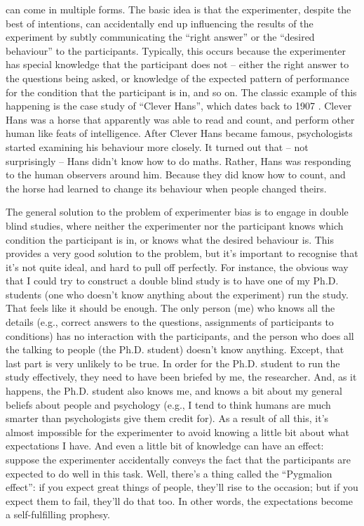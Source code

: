 
 can come in multiple forms. The basic idea is that the experimenter, despite the best of intentions, can accidentally end up influencing the results of the experiment by subtly communicating the ``right answer'' or the ``desired behaviour'' to the participants. Typically, this occurs because the experimenter has special knowledge that the participant does not -- either the right answer to the questions being asked, or knowledge of the expected pattern of performance for the condition that the participant is in, and so on. The classic example of this happening is the case study of ``Clever Hans'', which dates back to 1907 \parencite{Pfungst1911,Hothersall2004}. Clever Hans was a horse that apparently was able to read and count, and perform other human like feats of intelligence. After Clever Hans became famous, psychologists started examining his behaviour more closely. It turned out that -- not surprisingly -- Hans didn't know how to do maths. Rather, Hans was responding to the human observers around him. Because they did know how to count, and the horse had learned to change its behaviour when people changed theirs. 



The general solution to the problem of experimenter bias is to engage in double blind studies, where neither the experimenter nor the participant knows which condition the participant is in, or knows what the desired behaviour is. This provides a very good solution to the problem, but it's important to recognise that it's not quite ideal, and hard to pull off perfectly. For instance, the obvious way that I could try to construct a double blind study is to have one of my Ph.D. students (one who doesn't know anything about the experiment) run the study. That feels like it should be enough. The only person (me) who knows all the details (e.g., correct answers to the questions, assignments of participants to conditions) has no interaction with the participants, and the person who does all the talking to people (the Ph.D. student) doesn't know anything. Except, that last part is very unlikely to be true. In order for the Ph.D. student to run the study effectively, they need to have been briefed by me, the researcher. And, as it happens, the Ph.D. student also knows me, and knows a bit about my general beliefs about people and psychology (e.g., I tend to think humans are much smarter than psychologists give them credit for).  As a result of all this, it's almost impossible for the experimenter to avoid knowing a little bit about what expectations I have. And even a little bit of knowledge can have an effect: suppose the experimenter accidentally conveys the fact that the participants are expected to do well in this task. Well, there's a thing called the ``Pygmalion effect'': if you expect great things of people, they'll rise to the occasion; but if you expect them to fail, they'll do that too. In other words, the expectations become a self-fulfilling prophesy.

